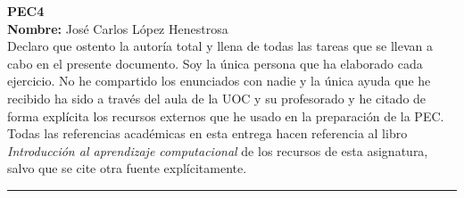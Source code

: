 \documentclass[11pt, a4paper]{article}
\begin{document}
	\begin{center}
			\Large{ \textbf{PEC4} } \\
			\vspace{0.5cm}
			\normalsize{\textbf{Nombre:} José Carlos López Henestrosa} \\
			\vspace{0.5cm}
			\normalsize{Declaro que ostento la autoría total y llena de todas las tareas que se llevan a cabo en el presente documento. Soy la única persona que ha elaborado cada ejercicio. No he compartido los enunciados con nadie y la única ayuda que he recibido ha sido a través del aula de la UOC y su profesorado y he citado de forma explícita los recursos externos que he usado en la preparación de la PEC.} \\
			\vspace{0.5cm}
			\normalsize{Todas las referencias académicas en esta entrega hacen referencia al libro \textit{Introducción al aprendizaje computacional} de los recursos de esta asignatura, salvo que se cite otra fuente explícitamente.}
	\end{center}

	\vspace{1cm}
	\hrule
	\vspace{1cm}
\end{document}
